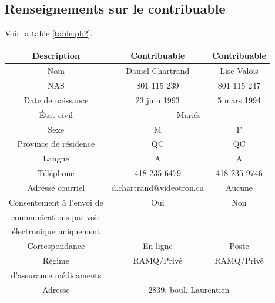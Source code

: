 \subsection{Renseignements sur le contribuable}
Voir la table \ref{table:pb2}.
\begin{table}
	\centering
	\begin{tabular}{|c|c|c|}
		\hline
		\rowcolor{LightGreen}Description &    Contribuable \no 1    & Contribuable \no 2 \\ \hline
		              Nom                &     Daniel Chartrand     &    Lise Valois     \\ \hline
		              NAS                &       801 115 239        &    801 115 247     \\ \hline
		       Date de naissance         &       23 juin 1993       &    5 mars 1994     \\ \hline
		           État civil            &          \multicolumn{2}{c|}{Mariés}          \\ \hline
		              Sexe               &            M             &         F          \\ \hline
		     Province de résidence       &            QC            &         QC         \\ \hline
		             Langue              &            A             &         A          \\ \hline
		           Téléphone             &       418 235-6479       &    418 235-9746    \\ \hline
		        Adresse courriel         & d.chartrand@videotron.ca &       Aucune       \\ \hline
		   Consentement à l'envoi de     &           Oui            &        Non         \\
		    communications par voie      &                          &                    \\
		    électronique uniquement      &                          &                    \\ \hline
		         Correspondance          &         En ligne         &       Poste        \\ \hline
		             Régime              &        RAMQ/Privé        &     RAMQ/Privé     \\
		    d'assurance médicaments      &                          &                    \\ \hline
		            Adresse              &  \multicolumn{2}{c|}{2839, boul. Laurentien}  \\

\end{tabular}
\end{table}

